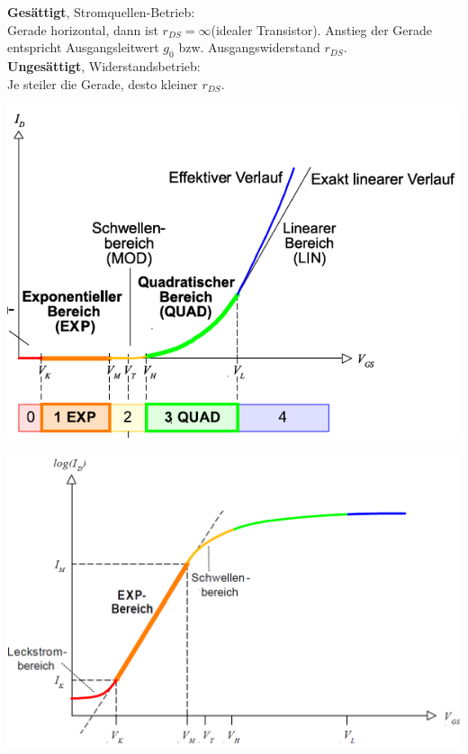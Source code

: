 \begin{minipage}{0.5\linewidth}
\textbf{Gesättigt}, Stromquellen-Betrieb:\\
Gerade horizontal, dann ist $r_{DS} = \infty$(idealer Transistor). Anstieg der Gerade entspricht Ausgangsleitwert $g_0$ bzw. Ausgangswiderstand $r_{DS}$.\\
\textbf{Ungesättigt}, Widerstandsbetrieb:\\
Je steiler die Gerade, desto kleiner $r_{DS}$.
\end{minipage}
\begin{minipage}{0.33\linewidth}
\includegraphics[width=1\linewidth]{Transferkennline.png}
\end{minipage}%
\begin{minipage}{0.33\linewidth}
\includegraphics[width=1\linewidth]{Transferkennline_Log.png}
\end{minipage}%
